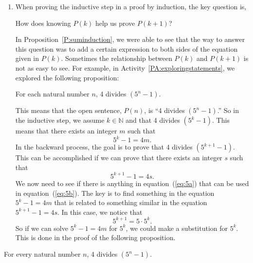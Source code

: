 \begin{enumerate}
\item When proving the inductive step in a proof by induction, the key question is, 
\begin{center}
How does knowing  $P(  k )$ help us prove  $P( {k + 1} )$?
\end{center}
\setcounter{equation}{0}
In Proposition~\ref{P:suminduction}, we were able to see that the way to answer this question was to add a certain expression to both sides of the equation given in  $P(  k )$. Sometimes the relationship between  $P(  k )$  and  $P( {k + 1} )$ is not as easy to see.  For example, in \typeu Activity~\ref*{PA:exploringstatements}, we explored the following proposition:
\begin{center}
For each natural number $n$,  4  divides  $\left( {5^n  - 1} \right)$.
\end{center}
%
This means that the open sentence, $P( n )$, is  ``4  divides  $\left( {5^n  - 1} \right)$.''  So in the inductive step, we assume  $k \in \mathbb{N}$ and that  4  divides  $\left( {5^k  - 1} \right)$.  This means that there exists an integer  $m$  such that
%
\begin{equation} \label{eq:5a}
5^k  - 1 = 4m.
\end{equation}
%
In the backward process, the goal is to prove that  4  divides  $\left( {5^{k + 1}  - 1} \right)$.  This can be accomplished if we can prove that there exists an integer  $s$  such that
\begin{equation} \label{eq:5b}
5^{k + 1}  - 1 = 4s.
\end{equation}
%
We now need to see if there is anything in equation~(\ref{eq:5a}) that can be used in equation~(\ref{eq:5b}).  The key is to find something in the equation $5^k - 1 = 4m$ that is related to something similar in the equation $5^{k + 1}  - 1 = 4s$.  In this case, we notice that
\[
5^{k + 1}  = 5 \cdot 5^k .
\]
So if we can solve $5^k  - 1 = 4m$  for  $5^k $, we could make a substitution for $5^k$.  This is done in the proof of the following proposition.
\end{enumerate}
%
\begin{proposition} \label{P:divideinduction}
For every natural number  $n$,  4  divides  $\left( {5^n  - 1} \right)$.
\end{proposition}
%
\setcounter{equation}{0}
